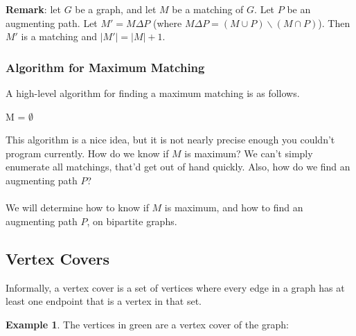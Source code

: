 \documentclass[]{article}
\theoremstyle{definition}
\newtheorem{ex}{Example}[section]
\newcommand{\lecture}[1]{\marginpar{{\footnotesize $\leftarrow$ \underline{#1}}}}
\begin{document}
				\textbf{Remark}: let $G$ be a graph, and let $M$ be a matching of $G$. Let $P$ be an augmenting path. Let $M' = M \Delta P$ (where $M \Delta P = (M \cup P) \backslash (M \cap P)$). Then $M'$ is a matching and $|M'| = |M| + 1$.
				
				\subsubsection{Algorithm for Maximum Matching} \lecture{April 1, 2013}
					A high-level algorithm for finding a maximum matching is as follows. \\
					\begin{algorithm}[H]
						M = $\emptyset$\;
					\end{algorithm}
					
					This algorithm is a nice idea, but it is not nearly precise enough \textendash{} you couldn't program currently. How do we know if $M$ is maximum? We can't simply enumerate all matchings, that'd get out of hand quickly. Also, how do we find an augmenting path $P$?
					\\ \\
					We will determine how to know if $M$ is maximum, and how to find an augmenting path $P$, on bipartite graphs.
				
		\subsection{Vertex Covers}
			Informally, a vertex cover is a set of vertices where every edge in a graph has at least one endpoint that is a vertex in that set.
			\begin{ex}
				The vertices in green are a vertex cover of the graph:
				\begin{center}
				\end{center}
			\end{ex}
			
\end{document}
